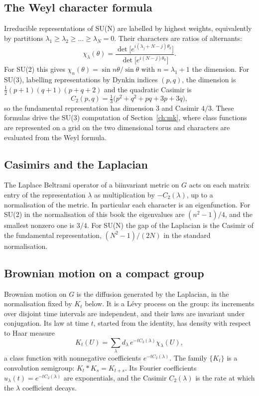 \subsection{The Weyl character formula}\label{sec:weylchar}

Irreducible representations of SU(N) are labelled by highest weights, equivalently by partitions $\lambda_1\ge\lambda_2\ge\dots\ge\lambda_N=0$. Their characters are ratios of alternants:
\[
\chi_\lambda(\theta)=\frac{\det\big[e^{i(\lambda_j+N-j)\theta_k}\big]}{\det\big[e^{i(N-j)\theta_k}\big]}.
\]
For SU(2) this gives $\chi_n(\theta)=\sin n\theta/\sin\theta$ with $n=\lambda_1+1$ the dimension. For SU(3), labelling representations by Dynkin indices $(p,q)$, the dimension is $\frac12(p+1)(q+1)(p+q+2)$ and the quadratic Casimir is
\[
C_2(p,q)=\tfrac13\big(p^2+q^2+pq+3p+3q\big),
\]
so the fundamental representation has dimension $3$ and Casimir $4/3$. These formulas drive the SU(3) computation of Section~\ref{ch:mk}, where class functions are represented on a grid on the two dimensional torus and characters are evaluated from the Weyl formula.

\subsection{Casimirs and the Laplacian}\label{sec:casimir}

The Laplace Beltrami operator of a biinvariant metric on $G$ acts on each matrix entry of the representation $\lambda$ as multiplication by $-C_2(\lambda)$, up to a normalisation of the metric. In particular each character is an eigenfunction. For SU(2) in the normalisation of this book the eigenvalues are $(n^2-1)/4$, and the smallest nonzero one is $3/4$. For SU(N) the gap of the Laplacian is the Casimir of the fundamental representation, $(N^2-1)/(2N)$ in the standard normalisation.

\subsection{Brownian motion on a compact group}\label{sec:bmgroup}

Brownian motion on $G$ is the diffusion generated by the Laplacian, in the normalisation fixed by $K_t$ below. It is a L\'evy process on the group: its increments over disjoint time intervals are independent, and their laws are invariant under conjugation. Its law at time $t$, started from the identity, has density with respect to Haar measure
\[
K_t(U)=\sum_\lambda d_\lambda\,e^{-tC_2(\lambda)}\chi_\lambda(U),
\]
a class function with nonnegative coefficients $e^{-tC_2(\lambda)}$. The family $\{K_t\}$ is a convolution semigroup: $K_t*K_s=K_{t+s}$. Its Fourier coefficients $u_\lambda(t)=e^{-tC_2(\lambda)}$ are exponentials, and the Casimir $C_2(\lambda)$ is the rate at which the $\lambda$ coefficient decays.

